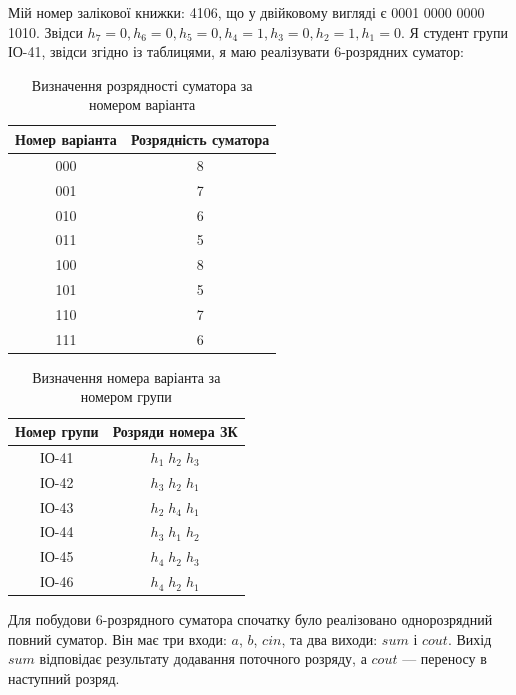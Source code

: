 \documentclass[12pt,a4paper]{article}
\begin{document}
    Мій номер залікової книжки: 4106, що у двійковому вигляді є 0001 0000 0000 1010.
    Звідси $h_7 = 0, h_6 = 0, h_5 = 0, h_4 = 1, h_3 = 0, h_2 = 1, h_1 = 0$. Я студент групи ІО-41, звідси згідно із таблицями, я маю реалізувати 6-розрядних суматор:

    \begin{table}[h!]
        \centering
        \renewcommand{\arraystretch}{1.3}
        \begin{tabular}{|c|c|}
            \hline
            \textbf{Номер варіанта} & \textbf{Розрядність суматора} \\ \hline
            000 & 8 \\ \hline
            001 & 7 \\ \hline
            \rowcolor{yellow!50}
            010 & 6 \\ \hline
            011 & 5 \\ \hline
            100 & 8 \\ \hline
            101 & 5 \\ \hline
            110 & 7 \\ \hline
            111 & 6 \\ \hline
        \end{tabular}
        \caption{Визначення розрядності суматора за номером варіанта}
    \end{table}

    \begin{table}[h!]
        \centering
        \renewcommand{\arraystretch}{1.3}
        \begin{tabular}{|c|c|}
            \hline
            \textbf{Номер групи} & \textbf{Розряди номера ЗК} \\ \hline
            \rowcolor{yellow!50}
            ІО-41 & $h_1\;h_2\;h_3$ \\ \hline
            ІО-42 & $h_3\;h_2\;h_1$ \\ \hline
            ІО-43 & $h_2\;h_4\;h_1$ \\ \hline
            ІО-44 & $h_3\;h_1\;h_2$ \\ \hline
            ІО-45 & $h_4\;h_2\;h_3$ \\ \hline
            ІО-46 & $h_4\;h_2\;h_1$ \\ \hline
        \end{tabular}
        \caption{Визначення номера варіанта за номером групи}
    \end{table}

    Для побудови 6-розрядного суматора спочатку було реалізовано однорозрядний повний суматор. Він має три входи: \(a\), \(b\), \(cin\), та два виходи: \(sum\) і \(cout\). Вихід \(sum\) відповідає результату додавання поточного розряду, а \(cout\) --- переносу в наступний розряд.
\end{document}
